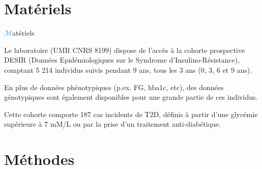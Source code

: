 \section{Matériels}
\begin{frame}{{\huge\textcolor{dodgerblue}{$\mathcal{M}$}}atériels}
\par{Le laboratoire (\textcolor{springgreen3}{UMR CNRS 8199}) dispose de l'accès à la cohorte prospective \textcolor{springgreen3}{DESIR}
(\textcolor{springgreen3}{D}onnées \textcolor{springgreen3}{E}pidémiologiques sur le \textcolor{springgreen3}{S}yndrome d’\textcolor{springgreen3}{I}nsulino-\textcolor{springgreen3}{R}ésistance),
comptant \textcolor{springgreen3}{5 214} individus suivis pendant \textcolor{springgreen3}{9} ans, tous les
\textcolor{springgreen3}{3 ans} (\textcolor{springgreen3}{0}, \textcolor{springgreen3}{3}, \textcolor{springgreen3}{6}
et \textcolor{springgreen3}{9} ans).}
\vspace{1em}
\par{En plus de données phénotypiques (p.ex. \textcolor{springgreen3}{FG}, \textcolor{springgreen3}{hba1c}, etc), des données génotypiques sont également disponibles
pour une grande partie de ces individus.}
\vspace{1em}
\par{Cette cohorte comporte \textcolor{springgreen3}{187} cas incidents de \textcolor{springgreen3}{T2D}, définis à partir
d'une glycémie supérieure à \textcolor{springgreen3}{7 mM/L} ou par la prise d'un traitement anti-diabétique. }
\end{frame}


\section{Méthodes}
